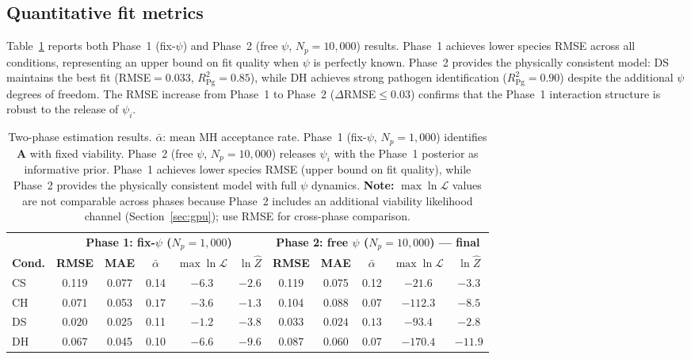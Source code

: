 \documentclass[11pt,a4paper]{article}
\begin{document}
\subsection{Quantitative fit metrics}

Table~\ref{tab:rmse} reports both Phase~1 (fix-$\psi$) and Phase~2 (free $\psi$, $N_p=10{,}000$) results.
Phase~1 achieves lower species RMSE across all conditions, representing an upper bound on fit quality when $\psi$ is perfectly known.
Phase~2 provides the physically consistent model: DS maintains the best fit (RMSE$=$0.033, $R^2_{\mathrm{Pg}}=0.85$), while DH achieves strong pathogen identification ($R^2_{\mathrm{Pg}}=0.90$) despite the additional $\psi$ degrees of freedom.
The RMSE increase from Phase~1 to Phase~2 ($\Delta$RMSE$\leq0.03$) confirms that the Phase~1 interaction structure is robust to the release of $\psi_i$.

\begin{table}[htbp]
\centering\small
\begin{tabular}{@{}l ccccc ccccc@{}}
\toprule
& \multicolumn{5}{c}{\textbf{Phase 1: fix-$\psi$ ($N_p\!=\!1{,}000$)}} & \multicolumn{5}{c}{\textbf{Phase 2: free $\psi$ ($N_p\!=\!10{,}000$) --- final}}\\
\cmidrule(lr){2-6}\cmidrule(lr){7-11}
\textbf{Cond.} & \textbf{RMSE} & \textbf{MAE} & $\bar{\alpha}$ & $\max\ln\mathcal{L}$ & $\ln\hat{Z}$ & \textbf{RMSE} & \textbf{MAE} & $\bar{\alpha}$ & $\max\ln\mathcal{L}$ & $\ln\hat{Z}$\\
\midrule
CS  & 0.119 & 0.077 & 0.14 & $-6.3$ & $-2.6$ & 0.119 & 0.075 & 0.12 & $-21.6$ & $-3.3$\\
CH  & 0.071 & 0.053 & $\mathbf{0.17}$ & $-3.6$ & $\mathbf{-1.3}$ & 0.104 & 0.088 & 0.07 & $-112.3$ & $-8.5$\\
DS  & $\mathbf{0.020}$ & $\mathbf{0.025}$ & 0.11 & $\mathbf{-1.2}$ & $-3.8$ & $\mathbf{0.033}$ & $\mathbf{0.024}$ & $\mathbf{0.13}$ & $-93.4$ & $\mathbf{-2.8}$\\
DH  & 0.067 & 0.045 & 0.10 & $-6.6$ & $-9.6$ & 0.087 & 0.060 & 0.07 & $-170.4$ & $-11.9$\\
\bottomrule
\end{tabular}
\caption{Two-phase estimation results.
$\bar{\alpha}$: mean MH acceptance rate.
Phase~1 (fix-$\psi$, $N_p=1{,}000$) identifies $\mathbf{A}$ with fixed viability.
Phase~2 (free $\psi$, $N_p=10{,}000$) releases $\psi_i$ with the Phase~1 posterior as informative prior.
Phase~1 achieves lower species RMSE (upper bound on fit quality), while Phase~2 provides the physically consistent model with full $\psi$ dynamics.
\textbf{Note:} $\max\ln\mathcal{L}$ values are not comparable across phases because Phase~2 includes an additional viability likelihood channel (Section~\ref{sec:gpu}); use RMSE for cross-phase comparison.}
\label{tab:rmse}
\end{table}
\end{document}
